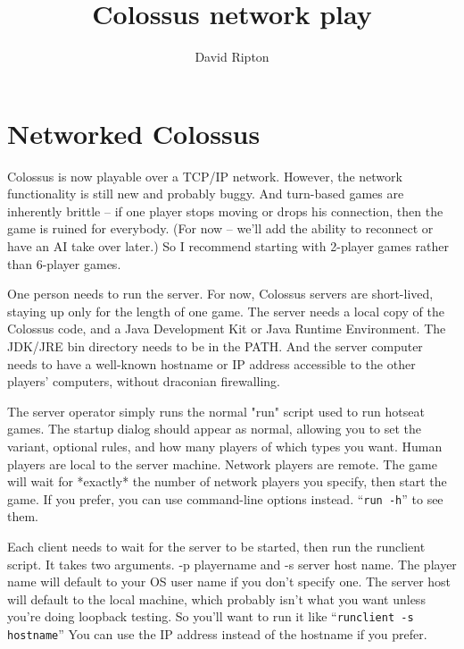 \documentclass{article}
\begin{document}

\title{Colossus network play}

\author{David Ripton}

\maketitle

\section{Networked Colossus}

Colossus is now playable over a TCP/IP network.  However, the network 
functionality is still new and probably buggy.  And turn-based games
are inherently brittle -- if one player stops moving or drops his 
connection, then the game is ruined for everybody.  (For now -- we'll
add the ability to reconnect or have an AI take over later.)  So I
recommend starting with 2-player games rather than 6-player games.

One person needs to run the server.  For now, Colossus servers are 
short-lived, staying up only for the length of one game.  The server
needs a local copy of the Colossus code, and a Java Development Kit 
or Java Runtime Environment.  The JDK/JRE bin directory needs to be 
in the PATH.  And the server computer needs to have a well-known 
hostname or IP address accessible to the other players' computers, 
without draconian firewalling.

The server operator simply runs the normal "run" script used to run 
hotseat games.  The startup dialog should appear as normal, allowing 
you to set the variant, optional rules, and how many players of which 
types you want.  Human players are local to the server machine.  
Network players are remote.  The game will wait for *exactly* the 
number of network players you specify, then start the game.  If you 
prefer, you can use command-line options instead.  ``\texttt{run -h}'' 
to see them.

Each client needs to wait for the server to be started, then run
the runclient script.  It takes two arguments.  -p playername and
-s server host name.  The player name will default to your OS user
name if you don't specify one.  The server host will default to the
local machine, which probably isn't what you want unless you're doing
loopback testing.  So you'll want to run it like
``\texttt{runclient -s hostname}''
You can use the IP address instead of the hostname if you prefer.
\end{document}
